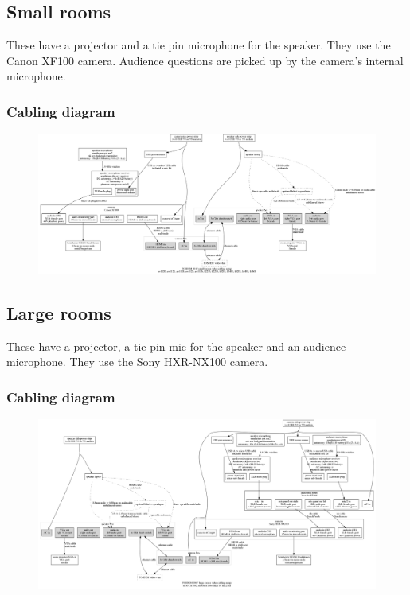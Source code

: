 \documentclass{article}
\begin{document}
\subsection{Small rooms}
These have a projector and a tie pin microphone for the speaker. They use the Canon XF100 camera. Audience questions are picked up by the camera's internal microphone.
\subsubsection{Cabling diagram}
\begin{figure}[H]
  \begin{sideways}
  \centering
  \includegraphics[width = 200mm]{../../graph/cabling_small_rooms.png}
  \end{sideways}
\end{figure}

\subsection{Large rooms}
These have a projector, a tie pin mic for the speaker and an audience microphone. They use the Sony HXR-NX100 camera. 
\subsubsection{Cabling diagram}
\begin{figure}[H]
  \begin{sideways}
  \centering
  \includegraphics[width = 200mm]{../../graph/cabling_large_rooms.png}
  \end{sideways}
\end{figure}
\end{document}
